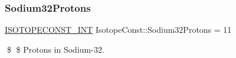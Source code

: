 \subsubsection{\texorpdfstring{Sodium32\+Protons}{Sodium32Protons}}
{\footnotesize\ttfamily \mbox{\hyperlink{group___isotope_const-_macros_ga5f18360b3e99483a35c32d789e62621c}{I\+S\+O\+T\+O\+P\+E\+C\+O\+N\+S\+T\+\_\+\+I\+NT}} Isotope\+Const\+::\+Sodium32\+Protons = 11}

\$ \$ Protons in Sodium-\/32. 